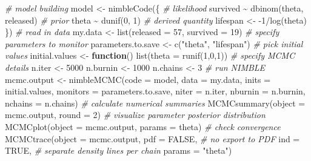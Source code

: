 \documentclass[
  12pt,
]{krantz}
\newenvironment{Shaded}{\begin{snugshade}}{\end{snugshade}}
\newcommand{\AttributeTok}[1]{\textcolor[rgb]{0.77,0.63,0.00}{#1}}
\newcommand{\CommentTok}[1]{\textcolor[rgb]{0.56,0.35,0.01}{\textit{#1}}}
\newcommand{\ConstantTok}[1]{\textcolor[rgb]{0.00,0.00,0.00}{#1}}
\newcommand{\ControlFlowTok}[1]{\textcolor[rgb]{0.13,0.29,0.53}{\textbf{#1}}}
\newcommand{\DecValTok}[1]{\textcolor[rgb]{0.00,0.00,0.81}{#1}}
\newcommand{\FunctionTok}[1]{\textcolor[rgb]{0.00,0.00,0.00}{#1}}
\newcommand{\NormalTok}[1]{#1}
\newcommand{\OtherTok}[1]{\textcolor[rgb]{0.56,0.35,0.01}{#1}}
\newcommand{\SpecialCharTok}[1]{\textcolor[rgb]{0.00,0.00,0.00}{#1}}
\newcommand{\StringTok}[1]{\textcolor[rgb]{0.31,0.60,0.02}{#1}}
\begin{document}
\begin{Shaded}
\begin{Highlighting}[]
\CommentTok{\# model building}
\NormalTok{model }\OtherTok{\textless{}{-}} \FunctionTok{nimbleCode}\NormalTok{(\{}
  \CommentTok{\# likelihood}
\NormalTok{  survived }\SpecialCharTok{\textasciitilde{}} \FunctionTok{dbinom}\NormalTok{(theta, released)}
  \CommentTok{\# prior}
\NormalTok{  theta }\SpecialCharTok{\textasciitilde{}} \FunctionTok{dunif}\NormalTok{(}\DecValTok{0}\NormalTok{, }\DecValTok{1}\NormalTok{)}
  \CommentTok{\# derived quantity}
\NormalTok{  lifespan }\OtherTok{\textless{}{-}} \SpecialCharTok{{-}}\DecValTok{1}\SpecialCharTok{/}\FunctionTok{log}\NormalTok{(theta)}
\NormalTok{\})}
\CommentTok{\# read in data}
\NormalTok{my.data }\OtherTok{\textless{}{-}} \FunctionTok{list}\NormalTok{(}\AttributeTok{released =} \DecValTok{57}\NormalTok{, }\AttributeTok{survived =} \DecValTok{19}\NormalTok{)}
\CommentTok{\# specify parameters to monitor}
\NormalTok{parameters.to.save }\OtherTok{\textless{}{-}} \FunctionTok{c}\NormalTok{(}\StringTok{"theta"}\NormalTok{, }\StringTok{"lifespan"}\NormalTok{)}
\CommentTok{\# pick initial values}
\NormalTok{initial.values }\OtherTok{\textless{}{-}} \ControlFlowTok{function}\NormalTok{() }\FunctionTok{list}\NormalTok{(}\AttributeTok{theta =} \FunctionTok{runif}\NormalTok{(}\DecValTok{1}\NormalTok{,}\DecValTok{0}\NormalTok{,}\DecValTok{1}\NormalTok{))}
\CommentTok{\# specify MCMC details}
\NormalTok{n.iter }\OtherTok{\textless{}{-}} \DecValTok{5000}
\NormalTok{n.burnin }\OtherTok{\textless{}{-}} \DecValTok{1000}
\NormalTok{n.chains }\OtherTok{\textless{}{-}} \DecValTok{3}
\CommentTok{\# run NIMBLE}
\NormalTok{mcmc.output }\OtherTok{\textless{}{-}} \FunctionTok{nimbleMCMC}\NormalTok{(}\AttributeTok{code =}\NormalTok{ model,}
                          \AttributeTok{data =}\NormalTok{ my.data,}
                          \AttributeTok{inits =}\NormalTok{ initial.values,}
                          \AttributeTok{monitors =}\NormalTok{ parameters.to.save,}
                          \AttributeTok{niter =}\NormalTok{ n.iter,}
                          \AttributeTok{nburnin =}\NormalTok{ n.burnin,}
                          \AttributeTok{nchains =}\NormalTok{ n.chains)}
\CommentTok{\# calculate numerical summaries}
\FunctionTok{MCMCsummary}\NormalTok{(}\AttributeTok{object =}\NormalTok{ mcmc.output, }\AttributeTok{round =} \DecValTok{2}\NormalTok{)}
\CommentTok{\# visualize parameter posterior distribution}
\FunctionTok{MCMCplot}\NormalTok{(}\AttributeTok{object =}\NormalTok{ mcmc.output, }
         \AttributeTok{params =} \StringTok{\textquotesingle{}theta\textquotesingle{}}\NormalTok{)}
\CommentTok{\# check convergence}
\FunctionTok{MCMCtrace}\NormalTok{(}\AttributeTok{object =}\NormalTok{ mcmc.output,}
          \AttributeTok{pdf =} \ConstantTok{FALSE}\NormalTok{, }\CommentTok{\# no export to PDF}
          \AttributeTok{ind =} \ConstantTok{TRUE}\NormalTok{, }\CommentTok{\# separate density lines per chain}
          \AttributeTok{params =} \StringTok{"theta"}\NormalTok{)}
\end{Highlighting}
\end{Shaded}
\end{document}
